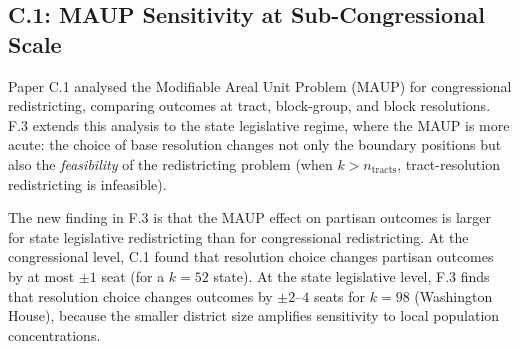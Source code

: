 \subsection{C.1: MAUP Sensitivity at Sub-Congressional Scale}
\label{sec:connections:c1}

Paper C.1 \citep{dellaLibera2026maup} analysed the Modifiable Areal Unit
Problem (MAUP) for congressional redistricting, comparing outcomes at tract,
block-group, and block resolutions. F.3 extends this analysis to the state
legislative regime, where the MAUP is more acute: the choice of base resolution
changes not only the boundary positions but also the \emph{feasibility} of the
redistricting problem (when $k > n_{\mathrm{tracts}}$, tract-resolution
redistricting is infeasible).

The new finding in F.3 is that the MAUP effect on partisan outcomes is larger
for state legislative redistricting than for congressional redistricting.
At the congressional level, C.1 found that resolution choice changes partisan
outcomes by at most $\pm 1$ seat (for a $k=52$ state). At the state legislative
level, F.3 finds that resolution choice changes outcomes by $\pm 2$--$4$ seats
for $k=98$ (Washington House), because the smaller district size amplifies
sensitivity to local population concentrations.
